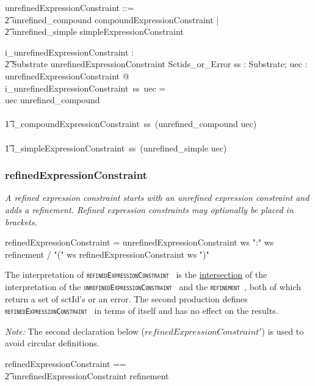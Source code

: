 \documentclass{article}
\def\spec#1{{\tt \small \textsc{{#1}} }}
\def\bnf#1{{\scriptsize {{#1}} }}
\def\desc#1{{\small \textsl{{#1}} }}
\begin{document}
\begin{zed}
unrefinedExpressionConstraint ::= \\
\t2 unrefined\_compound \ldata compoundExpressionConstraint \rdata | \\
\t2 unrefined\_simple \ldata simpleExpressionConstraint \rdata
\end{zed}
\begin{gendef}
   i\_unrefinedExpressionConstraint : \\
\t2 Substrate \fun unrefinedExpressionConstraint \fun Sctids\_or\_Error
\where
   \forall ss : Substrate; uec : unrefinedExpressionConstraint @  \\
   i\_unrefinedExpressionConstraint~ss~uec = \\
   \IF uec \in \ran unrefined\_compound \\
 \THEN \\
 \t1 i\_compoundExpressionConstraint~ss~(unrefined\_compound \inv uec) \\
\ELSE  \\
\t1 i\_simpleExpressionConstraint~ss~(unrefined\_simple \inv uec) 
\end{gendef}

\subsubsection{refinedExpressionConstraint}
\begin{framed}
\desc{A refined expression constraint starts with an unrefined expression constraint and adds a refinement. Refined expression constraints may optionally be placed in brackets.}
\end{framed}
\begin{framed}
\noindent
\bnf{refinedExpressionConstraint = unrefinedExpressionConstraint ws ":" ws refinement / "(" ws refinedExpressionConstraint ws ")"}
\end{framed}

The interpretation of \spec{refinedExpressionConstraint} is the \underline{intersection} of the interpretation of
the \spec{unrefinedExpressionConstraint} and the \spec{refinement}, both of which return a set of sctId's or
an error.  The second production defines \spec{refinedExpressionConstraint} in terms of itself and has no effect on the results.

\textit{Note:} The second declaration below ($refinedExpressionConstraint'$) is used to avoid circular definitions.

\begin{zed}
refinedExpressionConstraint == \\
\t2 unrefinedExpressionConstraint \cross refinement \\
[refinedExpressionConstraint']
\end{zed}
\end{document}
